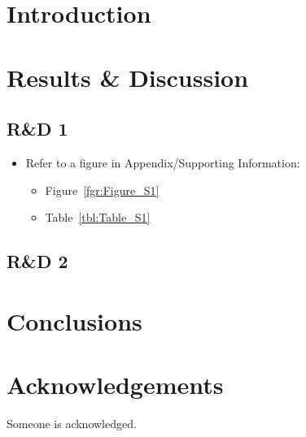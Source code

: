 \documentclass[main_brownies.tex]{subfiles}
\begin{document}
\section{Introduction}
\Blindtext[2][2]

\section[Short R\&D]{Results \& Discussion}  %
\subsection{R\&D 1}
\Blindtext[5][1]

\begin{itemize}
	\item Refer to a figure in Appendix/Supporting Information: 
	\begin{itemize}
		\item Figure~\ref{fgr:Figure_S1}
		\item Table~\ref{tbl:Table_S1}
	\end{itemize}
\end{itemize}

\subsection{R\&D 2}

\section{Conclusions}
\Blindtext[1][2]

\section*{Acknowledgements}

Someone is acknowledged.




{\raggedright
\printbibliography} %
\end{document}

